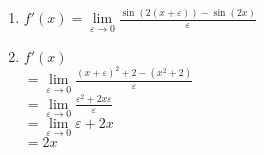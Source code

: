 \item

\begin{enumerate}
\item $f'(x) = \lim\limits_{\varepsilon\to 0} \frac{\sin(2(x+\varepsilon)) - \sin(2x)}{\varepsilon}$
\item
$f'(x)$ \\
$= \lim\limits_{\varepsilon \to 0} \frac{(x+\varepsilon)^2+2-(x^2+2)}{\varepsilon}$ \\
$= \lim\limits_{\varepsilon \to 0} \frac{\varepsilon^2+2x\varepsilon}{\varepsilon}$ \\
$=\lim\limits_{\varepsilon \to 0} \varepsilon+2x$ \\
$= 2x$

\end{enumerate}

